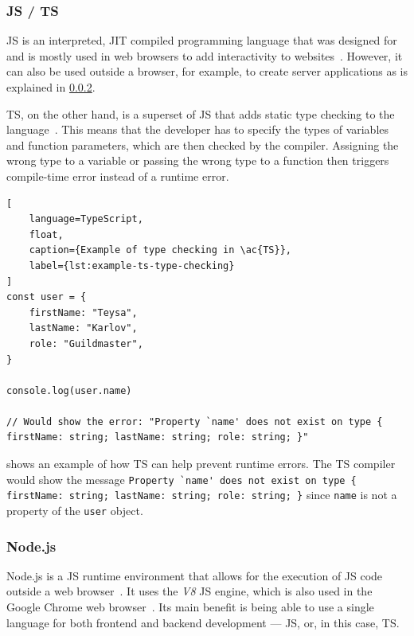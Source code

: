 \subsubsection{\acf{JS} / \acf{TS}}

\ac{JS} is an interpreted, \ac{JIT} compiled programming language that was designed for and is mostly used in web browsers to add interactivity to websites~\cite{mdn_javascript_2023}.
However, it can also be used outside a browser, for example, to create server applications as is explained in \cref{sec:nodejs}.

\ac{TS}, on the other hand, is a superset of \ac{JS} that adds static type checking to the language~\cite{microsoft_javascript_nodate}.
This means that the developer has to specify the types of variables and function parameters, which are then checked by the compiler.
Assigning the wrong type to a variable or passing the wrong type to a function then triggers compile-time error instead of a runtime error.

\begin{lstlisting}[
    language=TypeScript,
    float,
    caption={Example of type checking in \ac{TS}},
    label={lst:example-ts-type-checking}
]
const user = {
    firstName: "Teysa",
    lastName: "Karlov",
    role: "Guildmaster",
}
    
console.log(user.name)

// Would show the error: "Property `name' does not exist on type { firstName: string; lastName: string; role: string; }"
\end{lstlisting}

 shows an example of how \ac{TS} can help prevent runtime errors.
The \ac{TS} compiler would show the message \lstinline|Property `name' does not exist on type { firstName: string; lastName: string; role: string; }| since \lstinline{name} is not a property of the \lstinline{user} object.

\subsubsection{Node.js}\label{sec:nodejs}

Node.js is a \ac{JS} runtime environment that allows for the execution of \ac{JS} code outside a web browser~\cite{openjs_foundation_nodejs_nodate}.
It uses the \emph{V8} \ac{JS} engine, which is also used in the Google Chrome web browser~\cite{google_llc_v8_nodate}.
Its main benefit is being able to use a single language for both frontend and backend development --- \ac{JS}, or, in this case, \ac{TS}.

